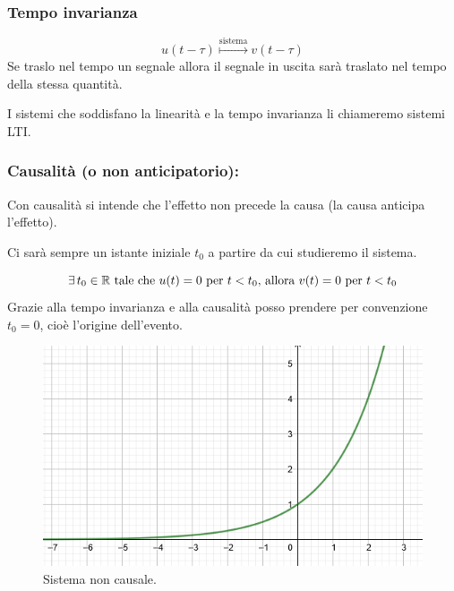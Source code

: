 		\subsubsection{Tempo invarianza} \label{sist_prop_TIn}
			\[
			u(t-\tau) \overset{\text{sistema}}{\longmapsto} v(t-\tau)
			\]
			Se traslo nel tempo un segnale allora il segnale in uscita sarà traslato nel tempo della stessa quantità.
			
			\begin{definizione}
				I sistemi che soddisfano la linearità e la tempo invarianza li chiameremo sistemi LTI.
			\end{definizione}
		
		\subsubsection{Causalità (o non anticipatorio):} \label{sist_prop_cau}
			
			Con causalità si intende che l'effetto non precede la causa (la causa anticipa l'effetto).
			
			\begin{osservazione}
				Ci sarà sempre un istante iniziale $t_0$ a partire da cui studieremo il sistema.
			\end{osservazione}
			\[
				\exists \,t_0 \in \mathbb{R} \text{ tale che } u(t)=0 \text{ per } t<t_0
				\text{, allora } v(t)=0 \text{ per } t<t_0
			\]		
			Grazie alla tempo invarianza e alla causalità posso prendere per convenzione $ t_0 = 0$, cioè l'origine dell'evento.
			
		
			\begin{figure}[H]
				\centering
				\includegraphics[scale=0.5]{immagini/esp1}
				\caption{ Sistema non causale. }
				\label{fig: esp1}
			\end{figure}
			
